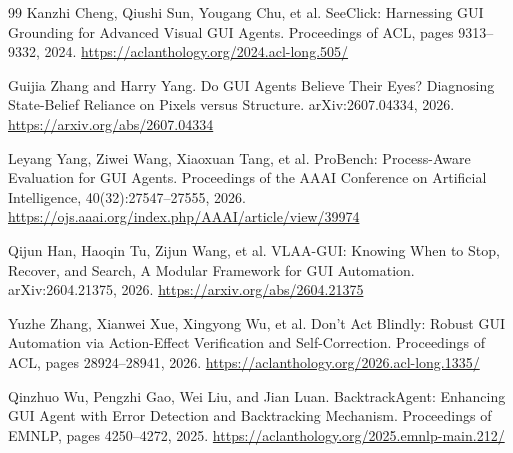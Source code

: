 \documentclass[12pt,a4paper]{ctexart}
\begin{document}
\begin{thebibliography}{99}
Kanzhi Cheng, Qiushi Sun, Yougang Chu, et al.
SeeClick: Harnessing GUI Grounding for Advanced Visual GUI Agents.
Proceedings of ACL, pages 9313--9332, 2024.
\url{https://aclanthology.org/2024.acl-long.505/}

Guijia Zhang and Harry Yang.
Do GUI Agents Believe Their Eyes? Diagnosing State-Belief Reliance on Pixels versus Structure.
arXiv:2607.04334, 2026.
\url{https://arxiv.org/abs/2607.04334}

Leyang Yang, Ziwei Wang, Xiaoxuan Tang, et al.
ProBench: Process-Aware Evaluation for GUI Agents.
Proceedings of the AAAI Conference on Artificial Intelligence, 40(32):27547--27555, 2026.
\url{https://ojs.aaai.org/index.php/AAAI/article/view/39974}

Qijun Han, Haoqin Tu, Zijun Wang, et al.
VLAA-GUI: Knowing When to Stop, Recover, and Search, A Modular Framework for GUI Automation.
arXiv:2604.21375, 2026.
\url{https://arxiv.org/abs/2604.21375}

Yuzhe Zhang, Xianwei Xue, Xingyong Wu, et al.
Don't Act Blindly: Robust GUI Automation via Action-Effect Verification and Self-Correction.
Proceedings of ACL, pages 28924--28941, 2026.
\url{https://aclanthology.org/2026.acl-long.1335/}

Qinzhuo Wu, Pengzhi Gao, Wei Liu, and Jian Luan.
BacktrackAgent: Enhancing GUI Agent with Error Detection and Backtracking Mechanism.
Proceedings of EMNLP, pages 4250--4272, 2025.
\url{https://aclanthology.org/2025.emnlp-main.212/}

\end{thebibliography}
\endgroup
\end{document}
